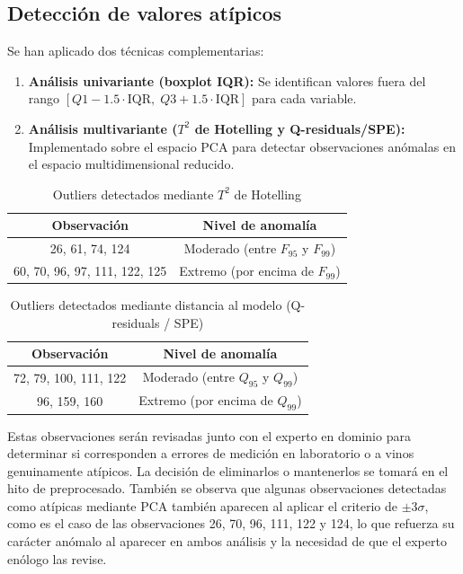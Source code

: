 \subsection{Detecci\'on de valores at\'ipicos}

Se han aplicado dos t\'ecnicas complementarias:

\begin{enumerate}
    \item \textbf{An\'alisis univariante (boxplot IQR):} Se identifican valores fuera
    del rango $[Q1 - 1.5 \cdot \mathrm{IQR},\; Q3 + 1.5 \cdot \mathrm{IQR}]$ para
    cada variable.

    \item \textbf{An\'alisis multivariante ($T^2$ de Hotelling y Q-residuals/SPE):}
    Implementado sobre el espacio PCA para detectar observaciones an\'omalas en el
    espacio multidimensional reducido.
\end{enumerate}

\begin{table}[H]
    \centering
    \caption{Outliers detectados mediante $T^2$ de Hotelling}
    \begin{tabular}{cc}
        \toprule
        \textbf{Observaci\'on}  & \textbf{Nivel de anomal\'ia} \\
        \midrule
        26, 61, 74, 124        & Moderado (entre $F_{95}$ y $F_{99}$) \\
        60, 70, 96, 97, 111, 122, 125 & Extremo (por encima de $F_{99}$) \\
        \bottomrule
    \end{tabular}
    \label{tab:outliers}
\end{table}

\begin{table}[H]
    \centering
    \caption{Outliers detectados mediante distancia al modelo (Q-residuals / SPE)}
    \begin{tabular}{cc}
        \toprule
        \textbf{Observaci\'on}  & \textbf{Nivel de anomal\'ia} \\
        \midrule
        72, 79, 100, 111, 122 & Moderado (entre $Q_{95}$ y $Q_{99}$) \\
        96, 159, 160          & Extremo (por encima de $Q_{99}$) \\
        \bottomrule
    \end{tabular}
    \label{tab:outliers_spe}
\end{table}

\noindent Estas observaciones ser\'an revisadas junto con el experto en dominio para
determinar si corresponden a errores de medici\'on en laboratorio o a vinos
genuinamente at\'ipicos. La decisi\'on de eliminarlos o mantenerlos se tomar\'a en
el hito de preprocesado. También se observa que algunas observaciones detectadas como at\'ipicas mediante
PCA tambi\'en aparecen al aplicar el criterio de $\pm 3\sigma$, como es el
caso de las observaciones 26, 70, 96, 111, 122 y 124, lo que refuerza su
car\'acter an\'omalo al aparecer en ambos an\'alisis y la necesidad de que el experto 
enólogo las revise. 


